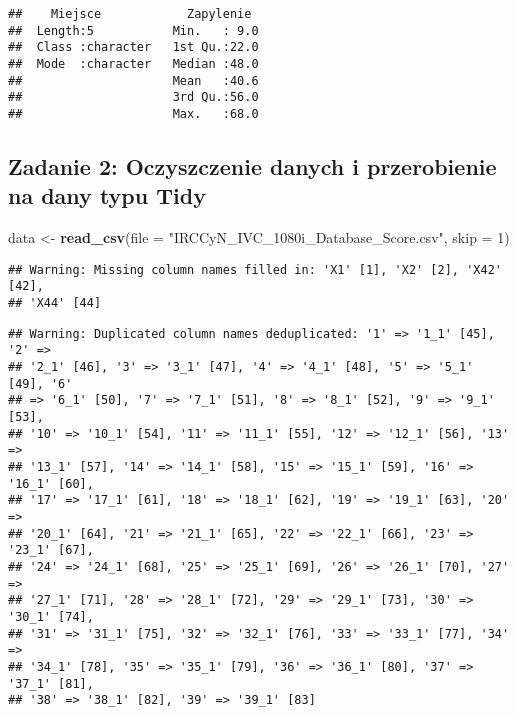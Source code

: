 \documentclass[]{article}
\newenvironment{Shaded}{\begin{snugshade}}{\end{snugshade}}
\newcommand{\DataTypeTok}[1]{\textcolor[rgb]{0.13,0.29,0.53}{#1}}
\newcommand{\DecValTok}[1]{\textcolor[rgb]{0.00,0.00,0.81}{#1}}
\newcommand{\KeywordTok}[1]{\textcolor[rgb]{0.13,0.29,0.53}{\textbf{#1}}}
\newcommand{\NormalTok}[1]{#1}
\newcommand{\StringTok}[1]{\textcolor[rgb]{0.31,0.60,0.02}{#1}}
\begin{document}
\begin{verbatim}
##    Miejsce            Zapylenie   
##  Length:5           Min.   : 9.0  
##  Class :character   1st Qu.:22.0  
##  Mode  :character   Median :48.0  
##                     Mean   :40.6  
##                     3rd Qu.:56.0  
##                     Max.   :68.0
\end{verbatim}

\hypertarget{zadanie-2-oczyszczenie-danych-i-przerobienie-na-dany-typu-tidy}{%
\subsection{Zadanie 2: Oczyszczenie danych i przerobienie na dany typu
Tidy}\label{zadanie-2-oczyszczenie-danych-i-przerobienie-na-dany-typu-tidy}}

\begin{Shaded}
\begin{Highlighting}[]
\NormalTok{data <-}\StringTok{ }\KeywordTok{read_csv}\NormalTok{(}\DataTypeTok{file =} \StringTok{"IRCCyN_IVC_1080i_Database_Score.csv"}\NormalTok{, }\DataTypeTok{skip =} \DecValTok{1}\NormalTok{)}
\end{Highlighting}
\end{Shaded}

\begin{verbatim}
## Warning: Missing column names filled in: 'X1' [1], 'X2' [2], 'X42' [42],
## 'X44' [44]
\end{verbatim}

\begin{verbatim}
## Warning: Duplicated column names deduplicated: '1' => '1_1' [45], '2' =>
## '2_1' [46], '3' => '3_1' [47], '4' => '4_1' [48], '5' => '5_1' [49], '6'
## => '6_1' [50], '7' => '7_1' [51], '8' => '8_1' [52], '9' => '9_1' [53],
## '10' => '10_1' [54], '11' => '11_1' [55], '12' => '12_1' [56], '13' =>
## '13_1' [57], '14' => '14_1' [58], '15' => '15_1' [59], '16' => '16_1' [60],
## '17' => '17_1' [61], '18' => '18_1' [62], '19' => '19_1' [63], '20' =>
## '20_1' [64], '21' => '21_1' [65], '22' => '22_1' [66], '23' => '23_1' [67],
## '24' => '24_1' [68], '25' => '25_1' [69], '26' => '26_1' [70], '27' =>
## '27_1' [71], '28' => '28_1' [72], '29' => '29_1' [73], '30' => '30_1' [74],
## '31' => '31_1' [75], '32' => '32_1' [76], '33' => '33_1' [77], '34' =>
## '34_1' [78], '35' => '35_1' [79], '36' => '36_1' [80], '37' => '37_1' [81],
## '38' => '38_1' [82], '39' => '39_1' [83]
\end{verbatim}
\end{document}
